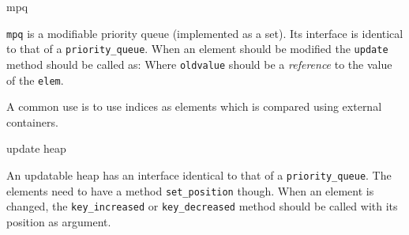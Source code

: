\categorycontents{}

\begin{algorithm}{mpq}

{\tt mpq} is a modifiable priority queue (implemented as a set). Its interface
is identical to that of a {\tt priority\_queue}. When an element should be
modified the {\tt update} method should be called as:
Where {\tt oldvalue} should be a \emph{reference} to the value of the
{\tt elem}.

A common use is to use indices as elements which is compared using external
containers.
\end{algorithm}


\begin{algorithm}{update heap}

An updatable heap has an interface identical to that of a
{\tt priority\_queue}.
The elements need to have a method {\tt set\_position} though. When an element
is changed, the {\tt key\_increased} or {\tt key\_decreased} method should
be called with its position as argument.
\end{algorithm}


\begin{sourceslandscape}
\end{sourceslandscape}
